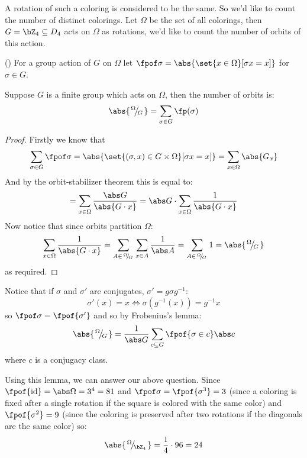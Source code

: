 \documentclass[10pt]{article}
\def\slfrac#1#2{\left.{}^{#1}\mkern-4mu\middle/\mkern-3mu{}_{#2}\right.}
\begin{document}
A rotation of such a coloring is considered to be the same.
So we'd like to count the number of distinct colorings.
Let $\Omega$ be the set of all colorings, then $G=\bZ_4\subseteq D_4$ acts on $\Omega$ as rotations, we'd like to count the number of orbits of this action.

({})
For a group action of $G$ on $\Omega$ let $\fpof\sigma=\abs{\set{x\in\Omega}[\sigma x=x]}$ for $\sigma\in G$.

\begin{lemm*}

    Suppose $G$ is a finite group which acts on $\Omega$, then the number of orbits is:
    \[ \abs{\slfrac\Omega G} = \sum_{\sigma\in G} \fp(\sigma) \]

\end{lemm*}

\begin{proof}

    Firstly we know that
    \[  \sum_{\sigma\in G}\fpof\sigma = \abs{\set{(\sigma,x)\in G\times\Omega}[\sigma x=x]} = \sum_{x\in\Omega}\abs{G_x} \]
    And by the orbit-stabilizer theorem this is equal to:
    \[ = \sum_{x\in\Omega}\frac{\abs G}{\abs{G\cdot x}} = \abs G\cdot\sum_{x\in\Omega}\frac1{\abs{G\cdot x}} \]
    Now notice that since orbits partition $\Omega$:
    \[ \sum_{x\in\Omega}\frac1{\abs{G\cdot x}} = \sum_{A\in\slfrac\Omega G}\sum_{x\in A}\frac1{\abs A} = \sum_{A\in\slfrac\Omega G}1 = \abs{\slfrac\Omega G} \]
    as required.

\end{proof}

Notice that if $\sigma$ and $\sigma'$ are conjugates, $\sigma'=g\sigma g^{-1}$:
\[ \sigma'(x)=x\iff\sigma(g^{-1}(x))=g^{-1}x \]
so $\fpof\sigma=\fpof{\sigma'}$ and so by Frobenius's lemma:
\[ \abs{\slfrac\Omega G}=\frac1{\abs G}\sum_{c\subseteq G}\fpof{\sigma\in c}\abs c \]
where $c$ is a conjugacy class.

Using this lemma, we can answer our above question.
Since $\fpof{\rm id}=\abs\Omega=3^4=81$ and $\fpof\sigma=\fpof{\sigma^3}=3$ (since a coloring is fixed after a single rotation if the square is colored with the same color) and $\fpof{\sigma^2}=9$ (since
the coloring is preserved after two rotations if the diagonals are the same color) so:
\[ \abs{\slfrac\Omega{\bZ_4}}=\frac14\cdot96=24 \]
\end{document}
